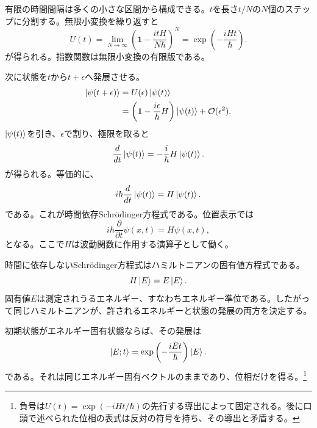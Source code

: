 \begin{classroomqa}
\end{classroomqa}

有限の時間間隔は多くの小さな区間から構成できる。\(t\)を長さ\(t/N\)の\(N\)個のステップに分割する。無限小変換を繰り返すと
\begin{equation}
U(t)
=
\lim_{N\to\infty}
\left(
\mathbf 1-\frac{itH}{N\hbar}
\right)^N
=
\exp\left(-\frac{iHt}{\hbar}\right).
\end{equation}
が得られる。指数関数は無限小変換の有限版である。

次に状態を\(t\)から\(t+\epsilon\)へ発展させる。
\begin{align}
\left\lvert\psi(t+\epsilon)\right\rangle
&=
U(\epsilon)\left\lvert\psi(t)\right\rangle
\\
&=
\left(
\mathbf 1-\frac{i\epsilon}{\hbar}H
\right)\left\lvert\psi(t)\right\rangle
+\mathcal O(\epsilon^2).
\end{align}
\(\left\lvert\psi(t)\right\rangle\)を引き、\(\epsilon\)で割り、極限を取ると
\begin{equation}
\frac{d}{dt}\left\lvert\psi(t)\right\rangle
=
-\frac{i}{\hbar}H\left\lvert\psi(t)\right\rangle.
\end{equation}
が得られる。等価的に、
\begin{equation}
i\hbar\frac{d}{dt}\left\lvert\psi(t)\right\rangle
=
H\left\lvert\psi(t)\right\rangle.
\end{equation}
である。これが時間依存Schr\"odinger方程式である。位置表示では
\begin{equation}
i\hbar\frac{\partial}{\partial t}\psi(x,t)
=
H\psi(x,t),
\end{equation}
となる。ここで\(H\)は波動関数に作用する演算子として働く。

時間に依存しないSchr\"odinger方程式はハミルトニアンの固有値方程式である。
\begin{equation}
H\left\lvert E\right\rangle=E\left\lvert E\right\rangle.
\end{equation}
固有値\(E\)は測定されうるエネルギー、すなわちエネルギー準位である。したがって同じハミルトニアンが、許されるエネルギーと状態の発展の両方を決定する。

初期状態がエネルギー固有状態ならば、その発展は
\begin{equation}
\left\lvert E;t\right\rangle
=
\exp\left(-\frac{iEt}{\hbar}\right)\left\lvert E\right\rangle.
\end{equation}
である。それは同じエネルギー固有ベクトルのままであり、位相だけを得る。\footnote{負号は\(U(t)=\exp(-iHt/\hbar)\)の先行する導出によって固定される。後に口頭で述べられた位相の表式は反対の符号を持ち、その導出と矛盾する。}

